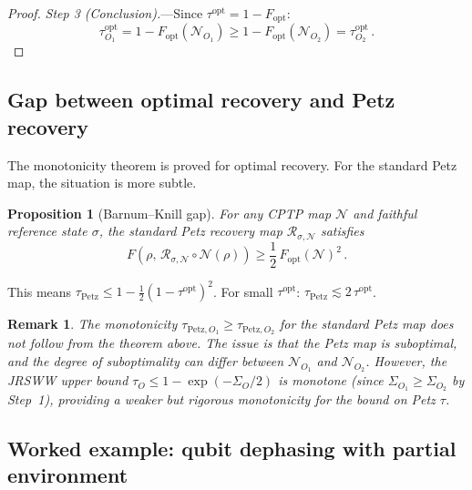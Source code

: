 \documentclass[aps,prd,preprint,superscriptaddress,longbibliography]{revtex4-2}
\newtheorem{proposition}[theorem]{Proposition}
\newtheorem*{remark}{Remark}
\newcommand{\Petz}{\mathcal{R}}
\newcommand{\chan}{\mathcal{N}}
\newcommand{\tauasym}{\tau}
\begin{document}
\begin{proof}
\emph{Step 3 (Conclusion).}---Since $\tauasym^{\mathrm{opt}} =
1 - F_{\mathrm{opt}}$:
\begin{equation}
  \tauasym_{O_1}^{\mathrm{opt}}
  = 1 - F_{\mathrm{opt}}(\chan_{O_1})
  \geq 1 - F_{\mathrm{opt}}(\chan_{O_2})
  = \tauasym_{O_2}^{\mathrm{opt}}\,.
  \label{eq:tau_mono_conclusion}
\end{equation}
\end{proof}

\subsection{Gap between optimal recovery and Petz recovery}

The monotonicity theorem is proved for optimal recovery.  For the
standard Petz map, the situation is more subtle.

\begin{proposition}[Barnum--Knill gap]
For any CPTP map $\chan$ and faithful reference state $\sigma$,
the standard Petz recovery map $\Petz_{\sigma,\chan}$ satisfies
\begin{equation}
  F(\rho,\,\Petz_{\sigma,\chan}\circ\chan(\rho))
  \geq \frac{1}{2}\,F_{\mathrm{opt}}(\chan)^2\,.
  \label{eq:BK}
\end{equation}
\end{proposition}

This means $\tauasym_{\mathrm{Petz}} \leq 1 - \frac{1}{2}(1-\tauasym^{\mathrm{opt}})^2$.
For small $\tauasym^{\mathrm{opt}}$:
$\tauasym_{\mathrm{Petz}} \lesssim 2\,\tauasym^{\mathrm{opt}}$.

\begin{remark}
The monotonicity $\tauasym_{\mathrm{Petz},O_1} \geq
\tauasym_{\mathrm{Petz},O_2}$ for the standard Petz map does not
follow from the theorem above.  The issue is that the Petz map is
suboptimal, and the degree of suboptimality can differ between
$\chan_{O_1}$ and $\chan_{O_2}$.  However, the JRSWW upper bound
$\tauasym_O \leq 1 - \exp(-\Sigma_O/2)$ \emph{is} monotone
(since $\Sigma_{O_1} \geq \Sigma_{O_2}$ by Step~1), providing a
weaker but rigorous monotonicity for the bound on Petz $\tauasym$.
\end{remark}

\subsection{Worked example: qubit dephasing with partial environment}
\end{document}
